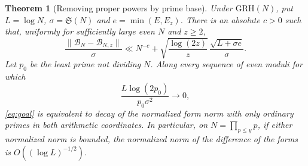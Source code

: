 \documentclass[11pt,a4paper]{article}
\numberwithin{equation}{section}
\newtheorem{theorem}{Theorem}[section]
\newcommand{\SSS}{\mathfrak S}
\newcommand{\grh}{\mathrm{GRH}}
\newcommand{\B}{\mathcal B_N}
\begin{document}
\begin{theorem}[Removing proper powers by prime base]
\label{thm:basecut}
Under $\grh(N)$, put $L=\log N$, $\sigma=\SSS(N)$ and
$e=\min(E,E_z)$. There is an absolute $c>0$ such that, uniformly
for sufficiently large even $N$ and $z\ge2$,
\begin{equation}
 \frac{\|\B-\mathcal B_{N,z}\|}{\sigma}
 \ll N^{-c}+
     \sqrt{\frac{\log(2z)}{z}}\,
     \frac{\sqrt{L+\sigma e}}{\sigma}.
 \label{eq:basecut}
\end{equation}
Let $p_0$ be the least prime not dividing $N$. Along every sequence
of even moduli for which
\[
 \frac{L\log(2p_0)}{p_0\sigma^2}\longrightarrow0,
\]
\eqref{eq:goal} is equivalent to decay of the normalized form norm
with only ordinary primes in both arithmetic coordinates.
In particular, on $N=\prod_{p\le y}p$, if either normalized norm
is bounded, the normalized norm of the difference of the forms is
$O((\log L)^{-1/2})$.
\end{theorem}
\end{document}
